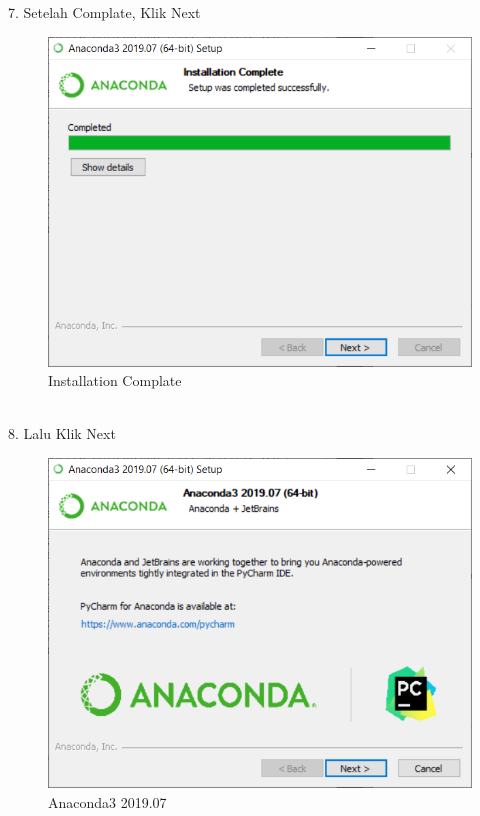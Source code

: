 \documentclass[12pt, times new roman, a4paper]{article}
\begin{document}
\\
\\
\\
\\
\\
\\
\\
\\
\\
\\
7. Setelah Complate, Klik Next\\
\begin{figure}[h]
	\centering
		\includegraphics[scale=0.5]{Gambar/A7}
	\caption{Installation Complate}
\end{figure}
\\
8. Lalu Klik Next\\
\begin{figure}[h]
	\centering
		\includegraphics[scale=0.5]{Gambar/A8}
	\caption{Anaconda3 2019.07}
\end{figure}
\end{document}
